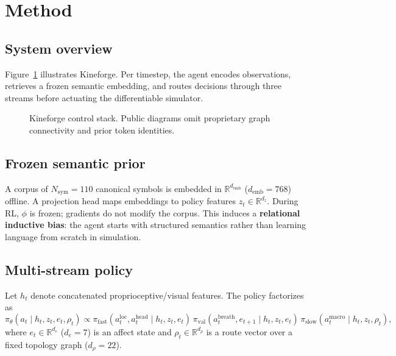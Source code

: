 \documentclass[11pt,a4paper]{article}
\begin{document}
\section{Method}
\label{sec:method}

\subsection{System overview}

Figure~\ref{fig:architecture} illustrates Kineforge. Per timestep, the agent encodes observations, retrieves a frozen semantic embedding, and routes decisions through three streams before actuating the differentiable simulator.

\begin{figure}[t]
  \centering
  \caption{Kineforge control stack. Public diagrams omit proprietary graph connectivity and prior token identities.}
  \label{fig:architecture}
\end{figure}

\subsection{Frozen semantic prior}

A corpus of $N_{\mathrm{sym}}{=}110$ canonical symbols is embedded in $\mathbb{R}^{d_{\mathrm{emb}}}$ ($d_{\mathrm{emb}}{=}768$) offline. A projection head maps embeddings to policy features $z_t \in \mathbb{R}^{d_z}$. During RL, $\phi$ is frozen; gradients do not modify the corpus. This induces a \textbf{relational inductive bias}: the agent starts with structured semantics rather than learning language from scratch in simulation.

\subsection{Multi-stream policy}

Let $h_t$ denote concatenated proprioceptive/visual features. The policy factorizes as
\begin{equation}
\pi_\theta(a_t \mid h_t, z_t, e_t, \rho_t) \propto
\pi_{\mathrm{fast}}(a^{\mathrm{loc}}_t, a^{\mathrm{head}}_t \mid h_t, z_t, e_t)\,
\pi_{\mathrm{val}}(a^{\mathrm{breath}}_t, e_{t+1} \mid h_t, z_t, e_t)\,
\pi_{\mathrm{slow}}(a^{\mathrm{macro}}_t \mid h_t, z_t, \rho_t),
\end{equation}
where $e_t \in \mathbb{R}^{d_e}$ ($d_e{=}7$) is an affect state and $\rho_t \in \mathbb{R}^{d_\rho}$ is a route vector over a fixed topology graph ($d_\rho{=}22$).
\end{document}
